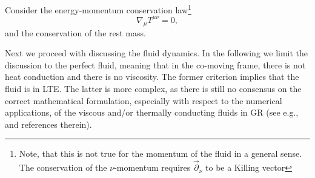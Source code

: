 Consider the energy-momentum conservation law\footnote{Note, that this is not true for the 
momentum of the fluid in a general sense. The conservation of the $\nu$-momentum requires 
$\vec{\partial}_{\nu}$ to be a Killing vector} 
%
\begin{equation}
    \nabla_{\mu}{T^{\mu\nu}} = 0,
    \label{eq:theory:tmunu_eq_0}
\end{equation}
%
and the conservation of the rest mass. 

Next we proceed with discussing the fluid dynamics. 
%
In the following we limit the discussion to the perfect fluid, meaning that in the co-moving frame, 
there is not heat conduction and there is no viscosity. The former criterion implies that the fluid is in 
\ac{LTE}. The latter is more complex, as there is still no consensus on the correct mathematical formulation, 
especially with respect to the numerical applications, of the viscous and/or thermally conducting fluids in 
\ac{GR} (see e.g., \citet{Andersson:2006nr} and references therein). 

